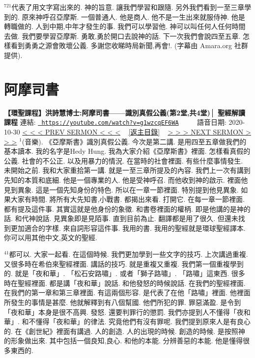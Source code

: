 \documentclass{book}
\begin{document}
$^{721}$代表了用文字寫出來的.
神的旨意.
讓我們學習和跟隨.
另外我們看到一至三章學到的.
原來神呼召亞摩斯.
一個普通人.
他是商人.
他不是一生出來就服侍神.
他是轉職做的.
人到中期,中年才發生的事.
我們可以學習他.
神可以叫任何人任何時間去做.
我們要學習亞摩斯.
勇敢,勇於開口去說神的話.
下一次我們會說四至五章.
怎樣看到勇勇之源會敗壞公義.
多謝您收睇時局新聞,再會!.
(字幕由 Amara.org 社群提供).
\newpage



\section{阿摩司書}
\label{sec:g1wzcqEF6WA}
\textbf{【環聖課程】洪詩慧博士:阿摩司書——識別真假公義(第2堂,共4堂)│ 聖經解讀課程}
\newline
\newline
連結: \href{https://youtube.com/watch?v=g1wzcqEF6WA}{\texttt{ https://youtube.com/watch?v=g1wzcqEF6WA}} ~~~~ 語音日期: 2020-10-30 
\newline
\newline
\hyperref[sec:ECCsRtsc_50]{\small{< < < PREV SERMON < < <}}
~
\hyperref[sec:index]{\small{[返主目錄]}}
~
\hyperref[sec:3OmAEo3dSsg]{\small{> > > NEXT SERMON > > >}}
\newline
\newline
$^{1}$(音樂).
《亞摩斯書》識別真假公義.
今次是第二講.
是用四至五章做我們的基本讀本.
我的名字是Hedy Hung.
我為大家介紹《亞摩斯書》裡面.
怎樣看真假的公義.
社會的不公正.
以及用暴力的情況.
在當時的社會裡面.
有些什麼事情發生.
未開始之前.
我和大家重拾第一講.
就是一至三章所提及的內容.
我們上一次有講到先知的本質和底細.
他是一個專業的人.
他是受神呼召.
而他收到神的啟示.
裡面他見到異象.
這是一個先知身份的特色.
所以在一章一節裡面.
特別提到他見異象.
如果大家有時間.
將所有大先知書,小戰書.
都揭出來看.
打開它.
在每一章一節裡面.
都有提及這件事.
其實這就是他身份的象徵.
和書卷裡面的權柄.
即是他講的是神的話.
和代神說話.
見異象即是見陌事.
直到目前為止.
翻譯都是用了很久.
但還未找到更加適合的字樣.
來自詞形容這件事.
我用的書.
我用的聖經就是環球聖經譯本.
你可以用其他中文,英文的聖經.

$^{41}$都可以.
大家一起看.
在這個時候.
我們更加學到一些文字的技巧.
上次講過重複.
又很多時在希伯來聖經裡面.
講話的技巧.
就是重複又重複.
我們第一個重複學到的.
就是「夜和華」.
「松石安路嘯」.
或者「獅子路嘯」.
「路嘯」這東西.
很多時在聖經裡面.
都是講「夜和華」說話.
和他發怒的時候說話.
在我們的聖經裡面.
在我們的第一章和第三章裡面.
有這兩個形容.
是代表了在他「路嘯」裡面.
他裡面所發生的事情是甚麼.
他就解釋到有八個幫國.
他們所犯的罪.
罪惡滿盈.
是令到「夜和華」本身是很不高興.
發怒.
還要判罪行的懲罰.
我們亦提到人不懂得「夜和華」.
和不懂得「夜和華」的律法.
究竟他們有沒有罪呢.
我們提到原來人是有良心的.
在《創世紀》裡面有講過.
人的創造.
人的出現的時候.
創造的時候.
是按照神的形象做出來.
其中包括一個良知,良心.
和他的本能.
分辨善惡的本能.
他是懂得很多東西的.
\end{document}
